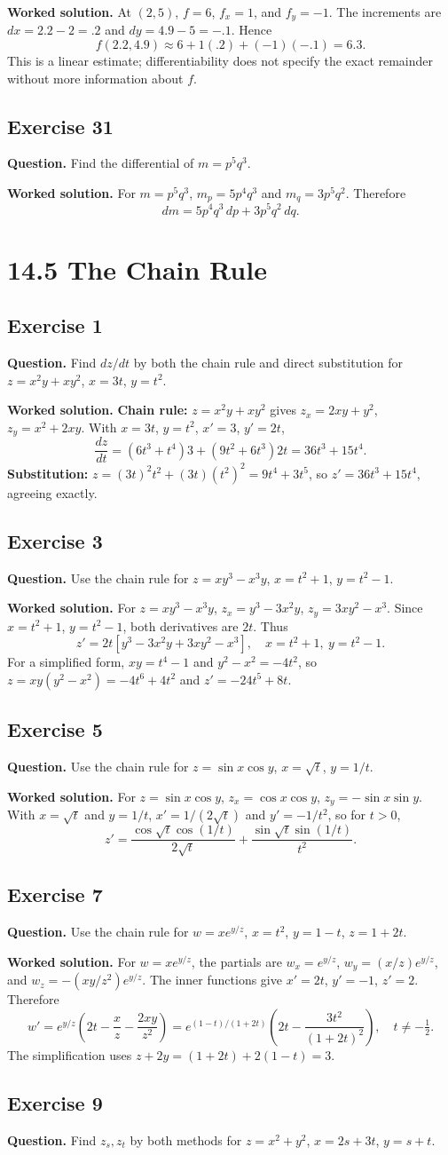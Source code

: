 \documentclass[11pt]{article}
\newcommand{\ex}[1]{\Needspace{8\baselineskip}\subsection*{Exercise #1}}
\newcommand{\ans}[1]{\boxed{#1}}
\begin{document}
\textbf{Worked solution.}
At $(2,5)$, $f=6$, $f_x=1$, and $f_y=-1$. The increments are $dx=2.2-2=.2$ and $dy=4.9-5=-.1$. Hence
\[f(2.2,4.9)\approx6+1(.2)+(-1)(-.1)=\ans{6.3}.\]
This is a linear estimate; differentiability does not specify the exact remainder without more information about $f$.
\ex{31}
\textbf{Question.} Find the differential of $m=p^5q^3$.

\textbf{Worked solution.}
For $m=p^5q^3$, $m_p=5p^4q^3$ and $m_q=3p^5q^2$. Therefore
\[\ans{dm=5p^4q^3\,dp+3p^5q^2\,dq}.\]
\clearpage\section*{14.5 The Chain Rule}
\ex{1}
\textbf{Question.} Find $dz/dt$ by both the chain rule and direct substitution for $z=x^2y+xy^2$, $x=3t$, $y=t^2$.

\textbf{Worked solution.}
\textbf{Chain rule:} $z=x^2y+xy^2$ gives $z_x=2xy+y^2$, $z_y=x^2+2xy$. With $x=3t$, $y=t^2$, $x'=3$, $y'=2t$,
\[\frac{dz}{dt}=(6t^3+t^4)3+(9t^2+6t^3)2t=\ans{36t^3+15t^4}.\]
\textbf{Substitution:} $z=(3t)^2t^2+(3t)(t^2)^2=9t^4+3t^5$, so $z'=36t^3+15t^4$, agreeing exactly.
\ex{3}
\textbf{Question.} Use the chain rule for $z=xy^3-x^3y$, $x=t^2+1$, $y=t^2-1$.

\textbf{Worked solution.}
For $z=xy^3-x^3y$, $z_x=y^3-3x^2y$, $z_y=3xy^2-x^3$. Since $x=t^2+1$, $y=t^2-1$, both derivatives are $2t$. Thus
\[\ans{z'=2t[y^3-3x^2y+3xy^2-x^3]},\quad x=t^2+1,\ y=t^2-1.\]
For a simplified form, $xy=t^4-1$ and $y^2-x^2=-4t^2$, so $z=xy(y^2-x^2)=-4t^6+4t^2$ and $\ans{z'=-24t^5+8t}$.
\ex{5}
\textbf{Question.} Use the chain rule for $z=\sin x\cos y$, $x=\sqrt t$, $y=1/t$.

\textbf{Worked solution.}
For $z=\sin x\cos y$, $z_x=\cos x\cos y$, $z_y=-\sin x\sin y$. With $x=\sqrt t$ and $y=1/t$, $x'=1/(2\sqrt t)$ and $y'=-1/t^2$, so for $t>0$,
\[\ans{z'=\frac{\cos\sqrt t\cos(1/t)}{2\sqrt t}+\frac{\sin\sqrt t\sin(1/t)}{t^2}}.\]
\ex{7}
\textbf{Question.} Use the chain rule for $w=xe^{y/z}$, $x=t^2$, $y=1-t$, $z=1+2t$.

\textbf{Worked solution.}
For $w=xe^{y/z}$, the partials are $w_x=e^{y/z}$, $w_y=(x/z)e^{y/z}$, and $w_z=-(xy/z^2)e^{y/z}$. The inner functions give $x'=2t$, $y'=-1$, $z'=2$. Therefore
\[w'=e^{y/z}\left(2t-\frac{x}{z}-\frac{2xy}{z^2}\right)
=\ans{e^{(1-t)/(1+2t)}\left(2t-\frac{3t^2}{(1+2t)^2}\right)},\quad t\ne-\tfrac12.\]
The simplification uses $z+2y=(1+2t)+2(1-t)=3$.
\ex{9}
\textbf{Question.} Find $z_s,z_t$ by both methods for $z=x^2+y^2$, $x=2s+3t$, $y=s+t$.
\end{document}
